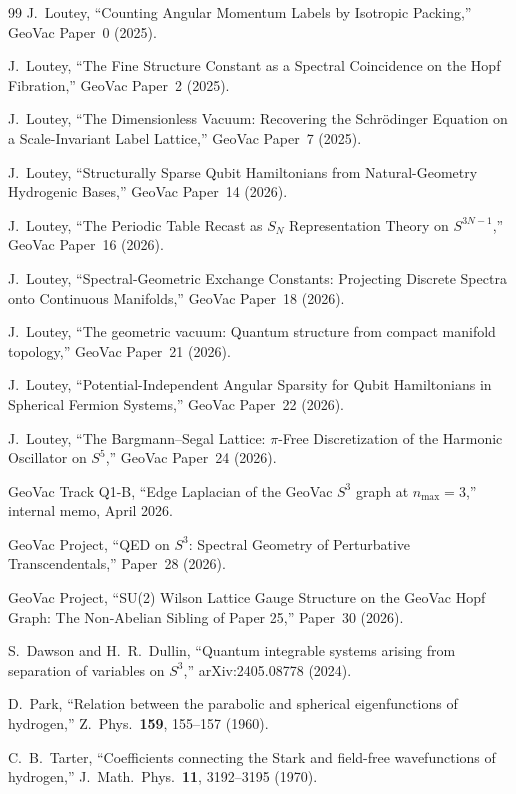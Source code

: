 \documentclass[aps,pra,twocolumn,superscriptaddress,longbibliography]{revtex4-2}
\begin{document}
\begin{thebibliography}{99}
J.~Loutey, ``Counting Angular Momentum Labels by Isotropic Packing,'' GeoVac Paper~0 (2025).

J.~Loutey, ``The Fine Structure Constant as a Spectral Coincidence on
the Hopf Fibration,'' GeoVac Paper~2 (2025).

J.~Loutey, ``The Dimensionless Vacuum: Recovering the Schr\"odinger
Equation on a Scale-Invariant Label Lattice,'' GeoVac Paper~7 (2025).

J.~Loutey, ``Structurally Sparse Qubit Hamiltonians from Natural-Geometry
Hydrogenic Bases,'' GeoVac Paper~14 (2026).

J.~Loutey, ``The Periodic Table Recast as $S_N$ Representation Theory
on $S^{3N-1}$,'' GeoVac Paper~16 (2026).

J.~Loutey, ``Spectral-Geometric Exchange Constants: Projecting
Discrete Spectra onto Continuous Manifolds,'' GeoVac Paper~18 (2026).

J.~Loutey, ``The geometric vacuum: Quantum structure from compact
manifold topology,'' GeoVac Paper~21 (2026).

J.~Loutey, ``Potential-Independent Angular Sparsity for Qubit
Hamiltonians in Spherical Fermion Systems,'' GeoVac Paper~22 (2026).

J.~Loutey, ``The Bargmann--Segal Lattice: $\pi$-Free Discretization
of the Harmonic Oscillator on $S^5$,'' GeoVac Paper~24 (2026).

GeoVac Track Q1-B, ``Edge Laplacian of the GeoVac $S^3$ graph at
$n_{\max} = 3$,'' internal memo, April 2026.

GeoVac Project, ``QED on $S^3$: Spectral Geometry of Perturbative
Transcendentals,'' Paper~28 (2026).

GeoVac Project, ``SU(2) Wilson Lattice Gauge Structure on the GeoVac
Hopf Graph: The Non-Abelian Sibling of Paper 25,'' Paper~30 (2026).

S.~Dawson and H.~R.~Dullin, ``Quantum integrable systems arising from separation of
variables on $S^3$,'' arXiv:2405.08778 (2024).

D.~Park, ``Relation between the parabolic and spherical eigenfunctions
of hydrogen,'' Z.\ Phys.\ \textbf{159}, 155--157 (1960).

C.~B.~Tarter, ``Coefficients connecting the Stark and field-free
wavefunctions of hydrogen,'' J.\ Math.\ Phys.\ \textbf{11}, 3192--3195
(1970).


\end{thebibliography}
\end{document}
